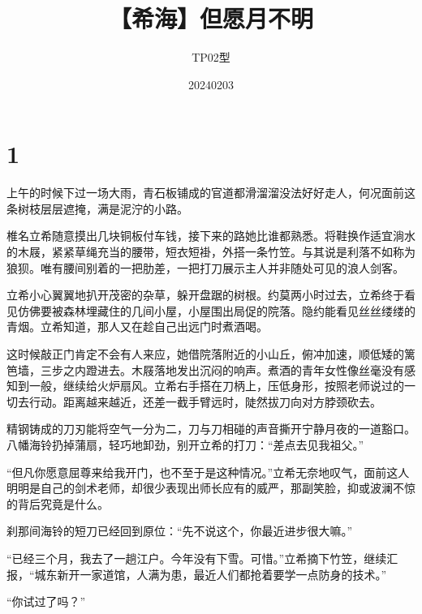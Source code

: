 \documentclass{article}
\title{【希海】但愿月不明}
\author{TP02型}
\date{20240203}
\begin{document}



\Large



{\centering\section*{1}}





上午的时候下过一场大雨，青石板铺成的官道都滑溜溜没法好好走人，何况面前这条树枝层层遮掩，满是泥泞的小路。



椎名立希随意摸出几块铜板付车钱，接下来的路她比谁都熟悉。将鞋换作适宜淌水的木屐，紧紧草绳充当的腰带，短衣短褂，外搭一条竹笠。与其说是利落不如称为狼狈。唯有腰间别着的一把肋差，一把打刀展示主人并非随处可见的浪人剑客。



立希小心翼翼地扒开茂密的杂草，躲开盘踞的树根。约莫两小时过去，立希终于看见仿佛要被森林埋藏住的几间小屋，小屋围出局促的院落。隐约能看见丝丝缕缕的青烟。立希知道，那人又在趁自己出远门时煮酒喝。



这时候敲正门肯定不会有人来应，她借院落附近的小山丘，俯冲加速，顺低矮的篱笆墙，三步之内蹬进去。木屐落地发出沉闷的响声。煮酒的青年女性像丝毫没有感知到一般，继续给火炉扇风。立希右手搭在刀柄上，压低身形，按照老师说过的一切去行动。距离越来越近，还差一截手臂远时，陡然拔刀向对方脖颈砍去。



精钢铸成的刀刃能将空气一分为二，刀与刀相碰的声音撕开宁静月夜的一道豁口。八幡海铃扔掉蒲扇，轻巧地卸劲，别开立希的打刀：“差点去见我祖父。”



“但凡你愿意屈尊来给我开门，也不至于是这种情况。”立希无奈地叹气，面前这人明明是自己的剑术老师，却很少表现出师长应有的威严，那副笑脸，抑或波澜不惊的背后究竟是什么。



刹那间海铃的短刀已经回到原位：“先不说这个，你最近进步很大嘛。”



“已经三个月，我去了一趟江户。今年没有下雪。可惜。”立希摘下竹笠，继续汇报，“城东新开一家道馆，人满为患，最近人们都抢着要学一点防身的技术。”



“你试过了吗？”
\end{document}
